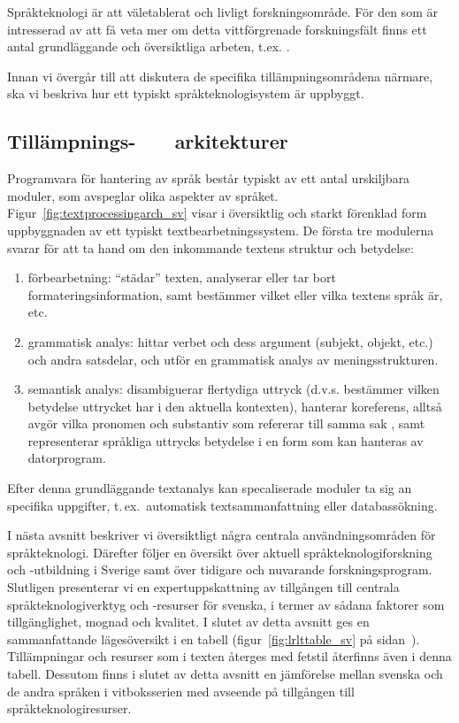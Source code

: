 \begin{multicols}{2}
Språkteknologi är att väletablerat och livligt forskningsområde. För
den som är intresserad av att få veta mer om detta vittförgrenade
forskningsfält finns ett antal grundläggande och översiktliga arbeten,
t.ex.
\cite{jurafsky-martin01,manning-schuetze1,lt-world1,lt-survey1}.

Innan vi övergår till att diskutera de specifika tillämpningsområdena
närmare, ska vi beskriva hur ett typiskt språkteknologisystem är
uppbyggt.


\subsection{Tillämpnings- \ \ \ arkitekturer}

Programvara för hantering av språk består typiskt av ett antal
urskiljbara moduler, som avspeglar olika aspekter av
språket. Figur~\ref{fig:textprocessingarch_sv} visar i översiktlig och
starkt förenklad form uppbyggnaden av ett typiskt
textbearbetningssystem. De första tre modulerna svarar för att ta hand
om den inkommande textens struktur och betydelse:
\begin{enumerate}
\item förbearbetning: ``städar'' texten, analyserar eller tar bort
  formateringsinformation, samt bestämmer vilket eller vilka textens
  språk är, etc.
\item grammatisk analys: hittar verbet och dess argument (subjekt,
  objekt, etc.) och andra satsdelar, och utför en grammatisk analys av
  meningsstrukturen.
\item semantisk analys: disambiguerar flertydiga uttryck
  (d.v.s. bestämmer vilken betydelse uttrycket har i den aktuella
  kontexten), hanterar koreferens, alltså avgör vilka pronomen och
  substantiv som refererar till samma sak%
, samt
  representerar språkliga uttrycks betydelse i en form som kan
  hanteras av datorprogram.
\end{enumerate}

Efter denna grundläggande textanalys kan specaliserade moduler ta sig
an specifika uppgifter, t.\,ex.~automatisk textsammanfattning eller
databassökning.

I nästa avsnitt beskriver vi översiktligt några centrala
användningsområden för språkteknologi. Därefter följer en översikt
över aktuell språkteknologiforskning och -utbildning i Sverige samt
över tidigare och nuvarande forskningsprogram. Slutligen presenterar
vi en expertuppskattning av tillgången till centrala
språkteknologiverktyg och -resurser för svenska, i termer av sådana
faktorer som tillgänglighet, mognad och kvalitet. I slutet av detta
avsnitt ges en sammanfattande lägesöversikt i en tabell
(figur~\ref{fig:lrlttable_sv} på
sidan~\pageref{fig:lrlttable_sv}). Tillämpningar och resurser som i
texten återges med fetstil återfinns även i denna tabell. Dessutom
finns i slutet av detta avsnitt en jämförelse mellan svenska och de
andra språken i vitboksserien med avseende på tillgången till
språkteknologiresurser.



\end{multicols}
